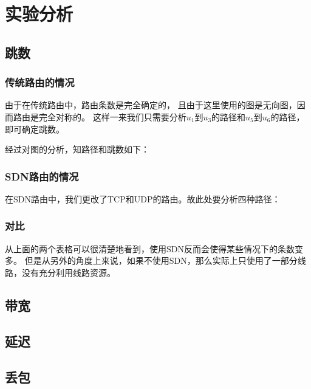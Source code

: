 \chapter{实验分析}
\label{cha:analyze}

\section{跳数}

\subsection{传统路由的情况}

由于在传统路由中，路由条数是完全确定的，
且由于这里使用的图是无向图，因而路由是完全对称的。
这样一来我们只需要分析$u_1$到$u_3$的路径和$u_5$到$u_6$的路径，
即可确定跳数。

经过对图的分析，知路径和跳数如下：



\subsection{SDN路由的情况}

在SDN路由中，我们更改了TCP和UDP的路由。故此处要分析四种路径：



\subsection{对比}

从上面的两个表格可以很清楚地看到，使用SDN反而会使得某些情况下的条数变多。
但是从另外的角度上来说，如果不使用SDN，那么实际上只使用了一部分线路，没有充分利用线路资源。

\section{带宽}


\section{延迟}

\section{丢包}

